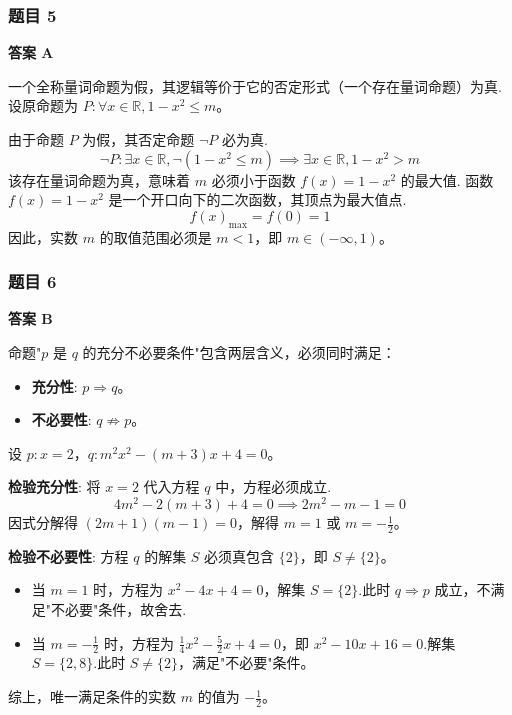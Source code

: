 \subsubsection*{题目 5}
\begin{solution}
	\textbf{答案 A}
	
	一个全称量词命题为假，其逻辑等价于它的否定形式（一个存在量词命题）为真.
	设原命题为 $P: \forall x \in \mathbb{R}, 1-x^2 \le m$。
	
	由于命题 $P$ 为假，其否定命题 $\neg P$ 必为真.
	\[ \neg P: \exists x \in \mathbb{R}, \neg(1-x^2 \le m) \implies \exists x \in \mathbb{R}, 1-x^2 > m \]
	该存在量词命题为真，意味着 $m$ 必须小于函数 $f(x) = 1-x^2$ 的最大值.
	函数 $f(x)=1-x^2$ 是一个开口向下的二次函数，其顶点为最大值点.
	\[ f(x)_{\max} = f(0) = 1 \]
	因此，实数 $m$ 的取值范围必须是 $m < 1$，即 $m \in (-\infty, 1)$。
\end{solution}

\subsubsection*{题目 6}
\begin{solution}
	\textbf{答案 B}
	
	命题"$p$ 是 $q$ 的充分不必要条件"包含两层含义，必须同时满足：
	\begin{itemize}
		\item \textbf{充分性}: $p \Rightarrow q$。
		\item \textbf{不必要性}: $q \not\Rightarrow p$。
	\end{itemize}
	设 $p: x=2$，$q: m^2x^2 - (m+3)x + 4 = 0$。
	
	\textbf{检验充分性}:
	将 $x=2$ 代入方程 $q$ 中，方程必须成立.
	\[ 4m^2 - 2(m+3) + 4 = 0 \implies 2m^2 - m - 1 = 0 \]
	因式分解得 $(2m+1)(m-1) = 0$，解得 $m=1$ 或 $m=-\frac{1}{2}$。
	
	\textbf{检验不必要性}:
	方程 $q$ 的解集 $S$ 必须真包含 $\{2\}$，即 $S \neq \{2\}$。
	\begin{itemize}
		\item 当 $m=1$ 时，方程为 $x^2 - 4x + 4 = 0$，解集 $S=\{2\}$.此时 $q \Rightarrow p$ 成立，不满足"不必要"条件，故舍去.
		\item 当 $m=-\frac{1}{2}$ 时，方程为 $\frac{1}{4}x^2 - \frac{5}{2}x + 4 = 0$，即 $x^2 - 10x + 16 = 0$.解集 $S=\{2, 8\}$.此时 $S \neq \{2\}$，满足"不必要"条件。
	\end{itemize}
	综上，唯一满足条件的实数 $m$ 的值为 $-\frac{1}{2}$。
\end{solution}

